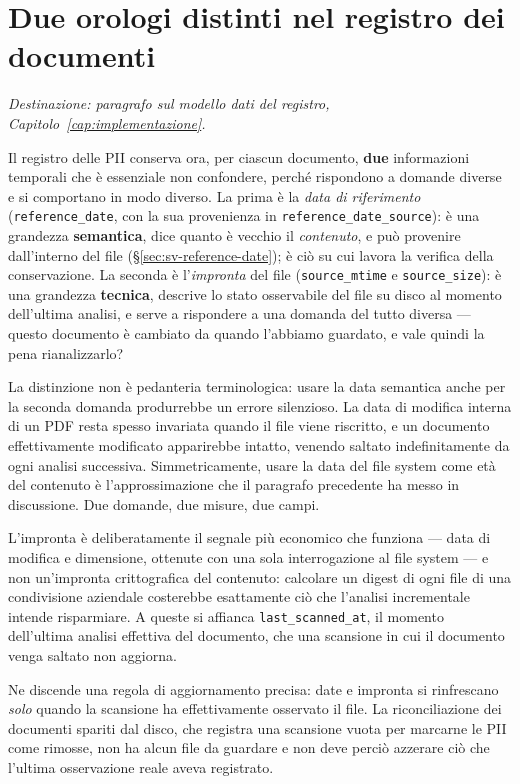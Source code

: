 \section{Due orologi distinti nel registro dei documenti}
\label{sec:sv-due-orologi}

\textit{Destinazione: paragrafo sul modello dati del registro, Capitolo~\ref{cap:implementazione}.} \medskip

Il registro delle PII conserva ora, per ciascun documento, \textbf{due} informazioni temporali che è essenziale non confondere, perché rispondono a domande diverse e si comportano in modo diverso. La prima è la \emph{data di riferimento} (\texttt{reference\_date}, con la sua provenienza in \texttt{reference\_date\_source}): è una grandezza \textbf{semantica}, dice quanto è vecchio il \emph{contenuto}, e può provenire dall'interno del file (§\ref{sec:sv-reference-date}); è ciò su cui lavora la verifica della conservazione. La seconda è l'\emph{impronta} del file (\texttt{source\_mtime} e \texttt{source\_size}): è una grandezza \textbf{tecnica}, descrive lo stato osservabile del file su disco al momento dell'ultima analisi, e serve a rispondere a una domanda del tutto diversa --- questo documento è cambiato da quando l'abbiamo guardato, e vale quindi la pena rianalizzarlo? \medskip

La distinzione non è pedanteria terminologica: usare la data semantica anche per la seconda domanda produrrebbe un errore silenzioso. La data di modifica interna di un PDF resta spesso invariata quando il file viene riscritto, e un documento effettivamente modificato apparirebbe intatto, venendo saltato indefinitamente da ogni analisi successiva. Simmetricamente, usare la data del file system come età del contenuto è l'approssimazione che il paragrafo precedente ha messo in discussione. Due domande, due misure, due campi. \medskip

L'impronta è deliberatamente il segnale più economico che funziona --- data di modifica e dimensione, ottenute con una sola interrogazione al file system --- e non un'impronta crittografica del contenuto: calcolare un digest di ogni file di una condivisione aziendale costerebbe esattamente ciò che l'analisi incrementale intende risparmiare. A queste si affianca \texttt{last\_scanned\_at}, il momento dell'ultima analisi effettiva del documento, che una scansione in cui il documento venga saltato non aggiorna. \medskip

Ne discende una regola di aggiornamento precisa: date e impronta si rinfrescano \emph{solo} quando la scansione ha effettivamente osservato il file. La riconciliazione dei documenti spariti dal disco, che registra una scansione vuota per marcarne le PII come rimosse, non ha alcun file da guardare e non deve perciò azzerare ciò che l'ultima osservazione reale aveva registrato.

